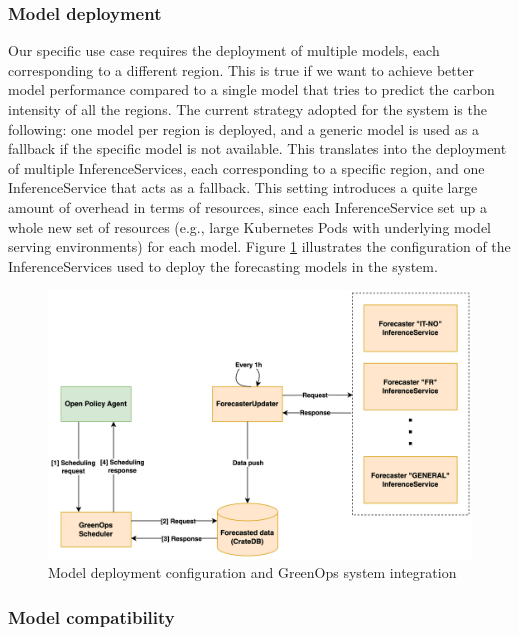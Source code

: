 \subsubsection{Model deployment}

Our specific use case requires the deployment of multiple models, each corresponding to a different region.
This is true if we want to achieve better model performance compared to a single model that tries to predict the carbon intensity of all the regions.
The current strategy adopted for the system is the following: one model per region is deployed, and a generic model is used as a fallback if the specific model is not available.
This translates into the deployment of multiple InferenceServices, each corresponding to a specific region, and one InferenceService that acts as a fallback.
This setting introduces a quite large amount of overhead in terms of resources, since each InferenceService set up a whole new set of resources (e.g., large Kubernetes Pods with underlying model serving environments) for each model.
Figure \ref{fig:forecaster} illustrates the configuration of the InferenceServices used to deploy the forecasting models in the system.

\begin{figure}[htb]
  \centering
  \includegraphics[width=1\linewidth]{images/forecaster.png}
  \caption{Model deployment configuration and GreenOps system integration}
  \label{fig:forecaster}
\end{figure}

\subsubsection{Model compatibility}


